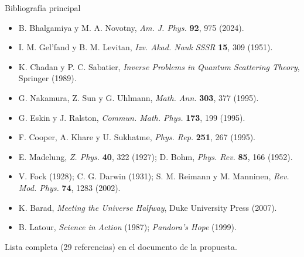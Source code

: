 \documentclass[aspectratio=169,10pt]{beamer}
\begin{document}
\begin{frame}{Bibliografía principal}
  \footnotesize
  \begin{itemize}
    \item B. Bhalgamiya y M. A. Novotny, \emph{Am. J. Phys.} \textbf{92}, 975 (2024).
    \item I. M. Gel'fand y B. M. Levitan, \emph{Izv. Akad. Nauk SSSR} \textbf{15}, 309 (1951).
    \item K. Chadan y P. C. Sabatier, \emph{Inverse Problems in Quantum Scattering Theory}, Springer (1989).
    \item G. Nakamura, Z. Sun y G. Uhlmann, \emph{Math. Ann.} \textbf{303}, 377 (1995).
    \item G. Eskin y J. Ralston, \emph{Commun. Math. Phys.} \textbf{173}, 199 (1995).
    \item F. Cooper, A. Khare y U. Sukhatme, \emph{Phys. Rep.} \textbf{251}, 267 (1995).
    \item E. Madelung, \emph{Z. Phys.} \textbf{40}, 322 (1927); D. Bohm, \emph{Phys. Rev.} \textbf{85}, 166 (1952).
    \item V. Fock (1928); C. G. Darwin (1931); S. M. Reimann y M. Manninen, \emph{Rev. Mod. Phys.} \textbf{74}, 1283 (2002).
    \item K. Barad, \emph{Meeting the Universe Halfway}, Duke University Press (2007).
    \item B. Latour, \emph{Science in Action} (1987); \emph{Pandora's Hope} (1999).
  \end{itemize}
  \normalsize
  \vspace{0.3em}
  \centering Lista completa (29 referencias) en el documento de la propuesta.
\end{frame}
\end{document}
